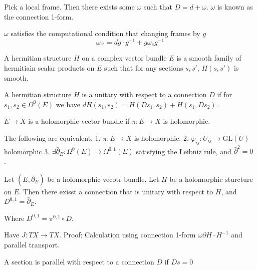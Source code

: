 Pick a local frame. 
Then there exists some $\omega$ such that $ D = d + \omega $. 
$\omega $ is known as the connection 1-form. 

$\omega $ satisfies the computational condition that changing frames by $g$ 
\begin{equation}
    \omega _ {e'} = dg \cdot g^{-1} + g \omega_e g^{-1} 
\end{equation}

\begin{definition}
A hermitian structure $H$ on a complex vector bundle $ E$ is a smooth family of 
    hermitiain scalar products on $E$ such that for any sections $ s, s'$, $ H(s,s') $ is smooth. 
\end{definition}

\begin{definition}
    A hermitian structure $H$ is a unitary with respect to a connection $D$ if 
    for $ s_1, s_2 \in \Omega^0 (E) $ we have $ dH(s_1, s_2 ) = H(Ds_1, s_2) + H(s_1, Ds_2)$.
\end{definition}

\begin{definition}
    $E \rightarrow  X$ is a holomorphic vector bundle if $ \pi: E \rightarrow X $ is holomorphic. 
\end{definition}

\begin{proposition}
The following are equivalent. 
    1. $ \pi : E \rightarrow X $ is holomorphic.
    2. $ \varphi_{ij} : U_{ij} \rightarrow \mathrm{GL}(U) $ holomorphic
    3. $ \exists \bar{\partial} _E : \Omega ^0 ( E) \rightarrow \Omega ^{0,1} ( E) $ 
    satisfying the Leibniz rule, and $ \bar{\partial} ^2  = 0 $ .
\end{proposition}

\begin{theorem}
  Let $ (E, \bar{\partial}_E ) $ be a holomorphic vecotr bundle. 
    Let $H$ be a holomorphic sturcture on $E$. 
    Then there exisst a connection that is unitary with respect to $H$, 
    and $D^{0,1} = \bar{\partial}_E$.
\end{theorem}

Where $ D^{0,1} = \pi^{0,1} \circ D$.

Have $ J : TX \rightarrow TX $. 
Proof: 
Calculation using connection 1-form $ \omega \partial H \cdot H^{-1}$
and parallel transport. 

\begin{definition}
A section is parallel with respect to a connection $ D$ if $Ds = 0 $
\end{definition}

